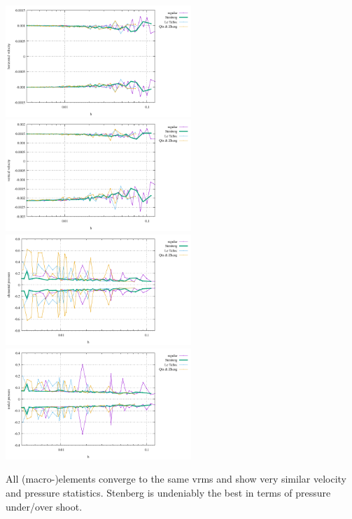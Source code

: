 \begin{center}
\includegraphics[width=7cm]{python_codes/fieldstone_78/results/sphere/ustats}
\includegraphics[width=7cm]{python_codes/fieldstone_78/results/sphere/vstats}\\
\includegraphics[width=7cm]{python_codes/fieldstone_78/results/sphere/pstats}
\includegraphics[width=7cm]{python_codes/fieldstone_78/results/sphere/qstats}
\end{center}

All (macro-)elements converge to the same vrms and show very similar velocity and pressure statistics.
Stenberg is undeniably the best in terms of pressure under/over shoot. 



